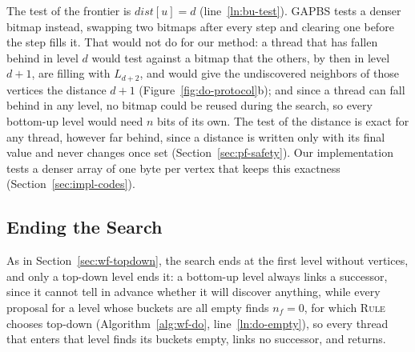 The test of the frontier is $\mathit{dist}[u] = d$ (line~\ref{ln:bu-test}). GAPBS tests a denser bitmap instead, swapping two bitmaps after every step and clearing one before the step fills it. That would not do for our method: a thread that has fallen behind in level $d$ would test against a bitmap that the others, by then in level $d+1$, are filling with $L_{d+2}$, and would give the undiscovered neighbors of those vertices the distance $d+1$ (Figure~\ref{fig:do-protocol}b); and since a thread can fall behind in any level, no bitmap could be reused during the search, so every bottom-up level would need $n$ bits of its own. The test of the distance is exact for any thread, however far behind, since a distance is written only with its final value and never changes once set (Section~\ref{sec:pf-safety}). Our implementation tests a denser array of one byte per vertex that keeps this exactness (Section~\ref{sec:impl-codes}).

\subsection{Ending the Search}
\label{sec:do-end}

As in Section~\ref{sec:wf-topdown}, the search ends at the first level without vertices, and only a top-down level ends it: a bottom-up level always links a successor, since it cannot tell in advance whether it will discover anything, while every proposal for a level whose buckets are all empty finds $n_f = 0$, for which \textsc{Rule} chooses top-down (Algorithm~\ref{alg:wf-do}, line~\ref{ln:do-empty}), so every thread that enters that level finds its buckets empty, links no successor, and returns.
